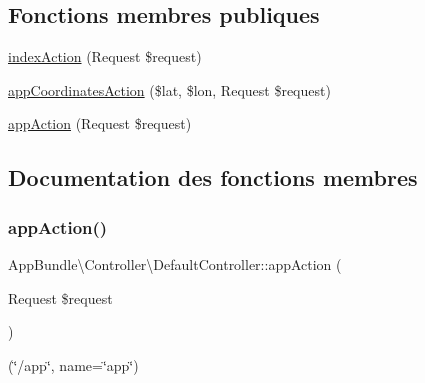 \subsection*{Fonctions membres publiques}
\begin{DoxyCompactItemize}
\item 
\hyperlink{classAppBundle_1_1Controller_1_1DefaultController_a8b0b26b1f8263360cfda801eef12e876}{index\+Action} (Request \$request)
\item 
\hyperlink{classAppBundle_1_1Controller_1_1DefaultController_a0e05a88ad81bdd7d285ed7f5e18e4db3}{app\+Coordinates\+Action} (\$lat, \$lon, Request \$request)
\item 
\hyperlink{classAppBundle_1_1Controller_1_1DefaultController_ad7e4ef81807736ad3c44c7b34b43410f}{app\+Action} (Request \$request)
\end{DoxyCompactItemize}


\subsection{Documentation des fonctions membres}
\mbox{\label{classAppBundle_1_1Controller_1_1DefaultController_ad7e4ef81807736ad3c44c7b34b43410f}} 
\subsubsection{\texorpdfstring{app\+Action()}{appAction()}}
{\footnotesize\ttfamily App\+Bundle\textbackslash{}\+Controller\textbackslash{}\+Default\+Controller\+::app\+Action (\begin{DoxyParamCaption}\item[{Request}]{\$request }\end{DoxyParamCaption})}

(\char`\"{}/app\char`\"{}, name=\char`\"{}app\char`\"{}) \mbox{\label{classAppBundle_1_1Controller_1_1DefaultController_a0e05a88ad81bdd7d285ed7f5e18e4db3}} 

